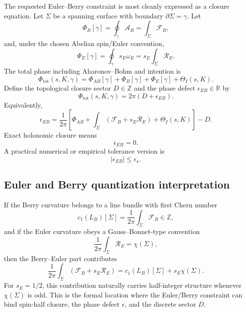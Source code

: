 \documentclass[11pt,a4paper]{article}
\newcommand{\epsEB}{\epsilon_{EB}}
\newcommand{\ThI}{\Theta_I}
\begin{document}
The requested Euler--Berry constraint is most cleanly expressed as a closure equation. Let $\Sigma$ be a spanning surface with boundary $\partial\Sigma=\gamma$. Let
\begin{equation}
  \Phi_B[\gamma]=\oint_\gamma\mathcal A_B=\int_\Sigma\mathcal F_B,
\end{equation}
and, under the chosen Abelian spin/Euler convention,
\begin{equation}
  \Phi_E[\gamma]=\oint_\gamma s_E\omega_E=s_E\int_\Sigma\mathcal R_E.
\end{equation}
The total phase including Aharonov--Bohm and intention is
\begin{equation}
  \Phi_{\mathrm{tot}}(s,K,\gamma)
  =\Phi_{AB}[\gamma]+\Phi_B[\gamma]+\Phi_E[\gamma]+\ThI(s,K).
\end{equation}
Define the topological closure sector $D\in\mathbb Z$ and the phase defect $\epsEB\in\mathbb R$ by
\begin{equation}
\boxed{
  \Phi_{\mathrm{tot}}(s,K,\gamma)
  =2\pi\left(D+\epsEB\right).}
  \label{eq:euler_berry_constraint_phase}
\end{equation}
Equivalently,
\begin{equation}
\boxed{
  \epsEB
  =\frac{1}{2\pi}
  \left[
    \Phi_{AB}+\int_\Sigma\left(\mathcal F_B+s_E\mathcal R_E\right)+\ThI(s,K)
  \right]-D.}
  \label{eq:euler_berry_constraint_defect}
\end{equation}
Exact holonomic closure means
\begin{equation}
  \boxed{\epsEB=0.}
\end{equation}
A practical numerical or empirical tolerance version is
\begin{equation}
  \boxed{|\epsEB|\leq \epsilon_\star.}
\end{equation}

\subsection{Euler and Berry quantization interpretation}

If the Berry curvature belongs to a line bundle with first Chern number
\begin{equation}
  c_1(L_B)[\Sigma]=\frac{1}{2\pi}\int_\Sigma\mathcal F_B\in\mathbb Z,
\end{equation}
and if the Euler curvature obeys a Gauss--Bonnet-type convention
\begin{equation}
  \frac{1}{2\pi}\int_\Sigma\mathcal R_E=\chi(\Sigma),
\end{equation}
then the Berry--Euler part contributes
\begin{equation}
  \frac{1}{2\pi}\int_\Sigma(\mathcal F_B+s_E\mathcal R_E)
  =c_1(L_B)[\Sigma]+s_E\chi(\Sigma).
\end{equation}
For $s_E=1/2$, this contribution naturally carries half-integer structure whenever $\chi(\Sigma)$ is odd. This is the formal location where the Euler/Berry constraint can bind spin-half closure, the phase defect $\epsilon$, and the discrete sector $D$.
\end{document}
